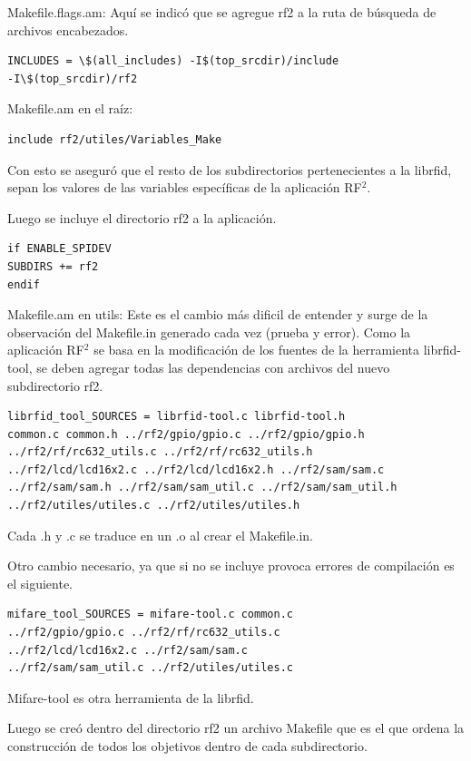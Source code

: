 \bigskip
Makefile.flags.am:
Aquí se indicó que se agregue rf2 a la ruta de búsqueda de archivos encabezados.

\begin{verbatim}
INCLUDES = \$(all_includes) -I$(top_srcdir)/include 
-I\$(top_srcdir)/rf2
\end{verbatim}

Makefile.am en el raíz:

\begin{verbatim}
include rf2/utiles/Variables_Make
\end{verbatim}
Con esto se aseguró que el resto de los subdirectorios pertenecientes a la librfid, sepan los valores de las variables específicas de la aplicación RF$^{2}$.

Luego se incluye el directorio rf2 a la aplicación.
\begin{verbatim}
if ENABLE_SPIDEV 
SUBDIRS += rf2 
endif
\end{verbatim}

\bigskip
Makefile.am en utils:
Este es el cambio más dificil de entender y surge de la observación del Makefile.in generado cada vez (prueba y error). Como la aplicación RF$^{2}$ se basa en la modificación de los fuentes de la herramienta librfid-tool, se deben agregar todas las dependencias con archivos del nuevo subdirectorio rf2.

\begin{verbatim}
librfid_tool_SOURCES = librfid-tool.c librfid-tool.h 
common.c common.h ../rf2/gpio/gpio.c ../rf2/gpio/gpio.h 
../rf2/rf/rc632_utils.c ../rf2/rf/rc632_utils.h 
../rf2/lcd/lcd16x2.c ../rf2/lcd/lcd16x2.h ../rf2/sam/sam.c 
../rf2/sam/sam.h ../rf2/sam/sam_util.c ../rf2/sam/sam_util.h 
../rf2/utiles/utiles.c ../rf2/utiles/utiles.h
\end{verbatim}

Cada .h y .c se traduce en un .o al crear el Makefile.in.

\bigskip
Otro cambio necesario, ya que si no se incluye provoca errores de compilación es el siguiente.

\begin{verbatim}
mifare_tool_SOURCES = mifare-tool.c common.c 
../rf2/gpio/gpio.c ../rf2/rf/rc632_utils.c 
../rf2/lcd/lcd16x2.c ../rf2/sam/sam.c 
../rf2/sam/sam_util.c ../rf2/utiles/utiles.c
\end{verbatim}

Mifare-tool es otra herramienta de la librfid.

\bigskip
Luego se creó dentro del directorio rf2 un archivo Makefile que es el que ordena la construcción de todos los objetivos dentro de cada subdirectorio.

